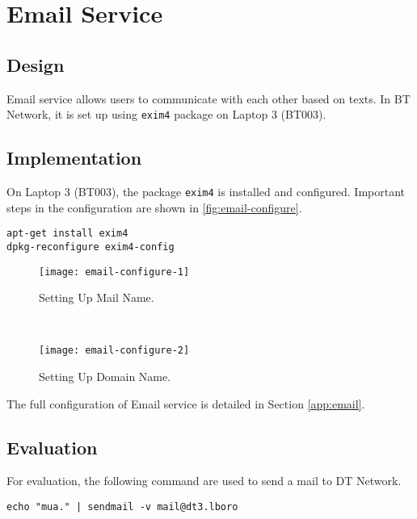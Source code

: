 \section{Email Service}
\label{sec:email}


\subsection{Design}
Email service\citep{rfc5322} allows users to communicate with each other based on texts. In BT Network, it is set up using \texttt{exim4} package on Laptop 3 (BT003).

\subsection{Implementation}
On Laptop 3 (BT003), the package \texttt{exim4} is installed and configured. Important steps in the configuration are shown in \ref{fig:email-configure}.

\begin{lstlisting}
apt-get install exim4
dpkg-reconfigure exim4-config
\end{lstlisting}

\begin{figure*}[ht!]
    \centering
    \begin{subfigure}[b]{\textwidth}
        \centering
        \texttt{[image: email-configure-1]}
        \caption{Setting Up Mail Name.}
    \end{subfigure}
    ~
    \begin{subfigure}[b]{\textwidth}
        \centering
        \texttt{[image: email-configure-2]}
        \caption{Setting Up Domain Name.}
    \end{subfigure}
    \caption{Important Configuration Steps for \texttt{exim4}.}
    \label{fig:email-configure}
\end{figure*}

The full configuration of Email service is detailed in Section \ref{app:email}.

\subsection{Evaluation}

For evaluation, the following command are used to send a mail to DT Network. 

\begin{lstlisting}
echo "mua." | sendmail -v mail@dt3.lboro
\end{lstlisting}

